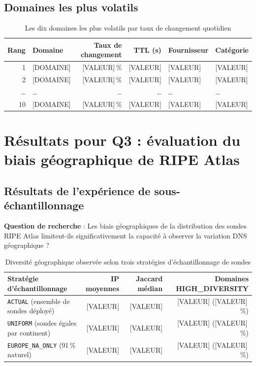\subsection{Domaines les plus volatils}
\label{subsec:4.3.4}

\begin{table}[H]
\centering
\small
\begin{tabularx}{\linewidth}{r X r r l l}
\toprule
\textbf{Rang} & \textbf{Domaine} & \textbf{Taux de changement} & \textbf{TTL (s)} & \textbf{Fournisseur} & \textbf{Catégorie} \\
\midrule
1 & [DOMAINE] & [VALEUR]\,\% & [VALEUR] & [VALEUR] & [VALEUR] \\
2 & [DOMAINE] & [VALEUR]\,\% & [VALEUR] & [VALEUR] & [VALEUR] \\
\ldots & \ldots & \ldots & \ldots & \ldots & \ldots \\
10 & [DOMAINE] & [VALEUR]\,\% & [VALEUR] & [VALEUR] & [VALEUR] \\
\bottomrule
\end{tabularx}
\caption{Les dix domaines les plus volatils par taux de changement quotidien}
\label{tab:volatile_domains}
\end{table}

\bigskip
\section{Résultats pour Q3 : évaluation du biais géographique de RIPE Atlas}
\label{sec:4.4}

\subsection{Résultats de l'expérience de sous-échantillonnage}
\label{subsec:4.4.1}

\textbf{Question de recherche} : Les biais géographiques de la distribution des sondes RIPE Atlas limitent-ils significativement la capacité à observer la variation DNS géographique ?

\begin{table}[H]
\centering
\small
\begin{tabularx}{\linewidth}{X r r r}
\toprule
\textbf{Stratégie d'échantillonnage} & \textbf{IP moyennes} & \textbf{Jaccard médian} & \textbf{Domaines HIGH\_DIVERSITY} \\
\midrule
\texttt{ACTUAL} (ensemble de sondes déployé) & [VALEUR] & [VALEUR] & [VALEUR] ([VALEUR]\,\%) \\
\texttt{UNIFORM} (sondes égales par continent) & [VALEUR] & [VALEUR] & [VALEUR] ([VALEUR]\,\%) \\
\texttt{EUROPE\_NA\_ONLY} (91\,\% naturel) & [VALEUR] & [VALEUR] & [VALEUR] ([VALEUR]\,\%) \\
\bottomrule
\end{tabularx}
\caption{Diversité géographique observée selon trois stratégies d'échantillonnage de sondes}
\label{tab:sampling_strategies}
\end{table}

